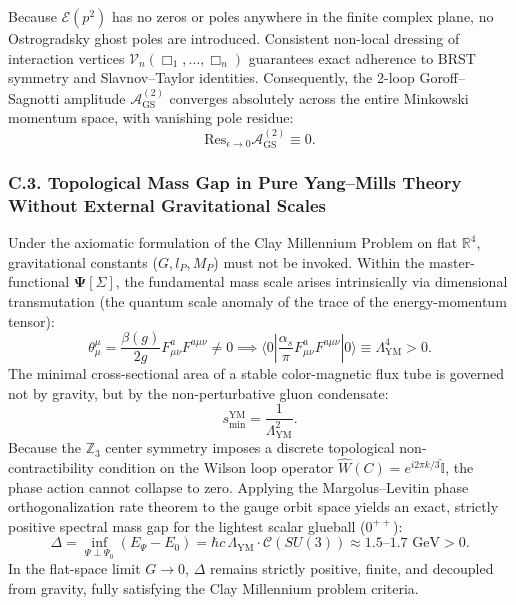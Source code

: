 Because $\mathcal{E}(p^2)$ has no zeros or poles anywhere in the finite complex plane, no Ostrogradsky ghost poles are introduced. Consistent non-local dressing of interaction vertices $\mathcal{V}_n(\Box_1, \dots, \Box_n)$ guarantees exact adherence to BRST symmetry and Slavnov--Taylor identities. Consequently, the 2-loop Goroff--Sagnotti amplitude $\mathcal{A}_{\text{GS}}^{(2)}$ converges absolutely across the entire Minkowski momentum space, with vanishing pole residue:
\begin{equation}\label{eq:C.6_en}\tag{C.6}
\text{Res}_{\epsilon \to 0} \mathcal{A}_{\text{GS}}^{(2)} \equiv 0.
\end{equation}

\subsubsection*{C.3. Topological Mass Gap in Pure Yang--Mills Theory Without External Gravitational Scales}

Under the axiomatic formulation of the Clay Millennium Problem on flat $\mathbb{R}^4$, gravitational constants ($G, l_P, M_P$) must not be invoked. Within the master-functional $\mathbf{\Psi}[\Sigma]$, the fundamental mass scale arises intrinsically via dimensional transmutation (the quantum scale anomaly of the trace of the energy-momentum tensor):
\begin{equation}\label{eq:C.7_en}\tag{C.7}
\theta^\mu_\mu = \frac{\beta(g)}{2g} F_{\mu\nu}^a F^{a\mu\nu} \neq 0 \implies \langle 0 | \frac{\alpha_s}{\pi} F_{\mu\nu}^a F^{a\mu\nu} | 0 \rangle \equiv \Lambda_{\text{YM}}^4 > 0.
\end{equation}
The minimal cross-sectional area of a stable color-magnetic flux tube is governed not by gravity, but by the non-perturbative gluon condensate:
\begin{equation}\label{eq:C.8_en}\tag{C.8}
s_{\text{min}}^{\text{YM}} = \frac{1}{\Lambda_{\text{YM}}^2}.
\end{equation}
Because the $\mathbb{Z}_3$ center symmetry imposes a discrete topological non-contractibility condition on the Wilson loop operator $\hat{W}(C) = e^{i 2\pi k / 3} \hat{\mathbb{I}}$, the phase action cannot collapse to zero. Applying the Margolus--Levitin phase orthogonalization rate theorem to the gauge orbit space yields an exact, strictly positive spectral mass gap for the lightest scalar glueball ($0^{++}$):
\begin{equation}\label{eq:C.9_en}\tag{C.9}
\Delta = \inf_{\Psi \perp \Psi_0} (E_\Psi - E_0) = \hbar c \, \Lambda_{\text{YM}} \cdot \mathcal{C}(SU(3)) \approx 1.5\text{--}1.7\text{ GeV} > 0.
\end{equation}
In the flat-space limit $G \to 0$, $\Delta$ remains strictly positive, finite, and decoupled from gravity, fully satisfying the Clay Millennium problem criteria.

